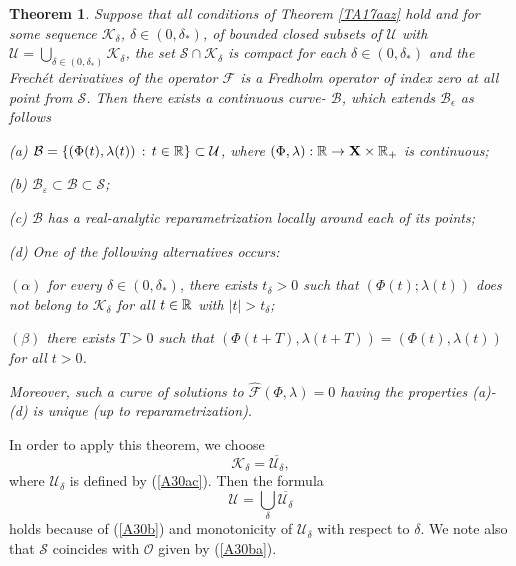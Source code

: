 \documentclass[a4paper,reqno,12pt]{amsart}
\theoremstyle{plain}
\newtheorem{theorem}{Theorem}[section]
\theoremstyle{definition}
\numberwithin{equation}{section}
\begin{document}
\begin{theorem}\label{ThJ3a} Suppose that all conditions of Theorem \ref{TA17aaz} hold and for some sequence ${\mathcal K}_\delta$, $\delta\in (0,\delta_*)$, of bounded closed subsets of ${\mathcal U}$ with ${\mathcal U}=\bigcup_{\delta\in (0,\delta_*)}{\mathcal K}_\delta$, the set ${\mathcal S}\cap {\mathcal K}_\delta$ is compact for each $\delta\in (0,\delta_*)$ and the Frech\'{e}t derivatives of the operator ${\mathcal F}$ is a Fredholm operator of index zero at all point from ${\mathcal S}$.
Then there exists a continuous curve- ${\mathcal B}$, which extends ${\mathcal B}_\epsilon$ as follows

\medskip
(a) ${\mathcal B}=\{(\Phi(t),\lambda(t))\,:\, t\in \Bbb R\}\subset {\mathcal U}$,
where $(\Phi,\lambda): \Bbb R\rightarrow {\bf X}\times \Bbb R_+$ is continuous;

\medskip
(b) ${\mathcal B}_\varepsilon\subset {\mathcal B}\subset {\mathcal S}$;

\medskip
(c) ${\mathcal B}$ has a real-analytic reparametrization locally around each of its points;



\medskip
(d) One of the following alternatives occurs:

$(\alpha)$ for every  $\delta\in (0,\delta_*)$, there exists $t_\delta>0$ such that $(\Phi(t);\lambda(t))$ does not belong to ${\mathcal K}_\delta$ for all $t\in\Bbb R$ with $|t|>t_\delta$;

$(\beta)$ there exists $T>0$ such that $(\Phi(t+T),\lambda(t+T))=(\Phi(t),\lambda(t))$ for all $t>0$.

Moreover, such a curve of solutions to $\widehat{\mathcal F}(\Phi,\lambda)=0$ having the properties (a)-(d) is unique (up to reparametrization).

\end{theorem}

In order to apply this theorem, we choose
\begin{equation}\label{Jun16a}
{\mathcal K}_\delta =\overline{{\mathcal U}_\delta},
\end{equation}
where ${\mathcal U}_\delta$ is defined by (\ref{A30ac}). Then the formula 
\begin{equation}\label{Jun16aa}
{\mathcal U}=\bigcup_\delta \overline{{\mathcal U}_\delta}
\end{equation}
holds because of (\ref{A30b}) and monotonicity of ${\mathcal U}_\delta$ with respect to $\delta$.
 We note also that ${\mathcal S}$ coincides with ${\mathcal O}$ given by (\ref{A30ba}).%
\end{document}
